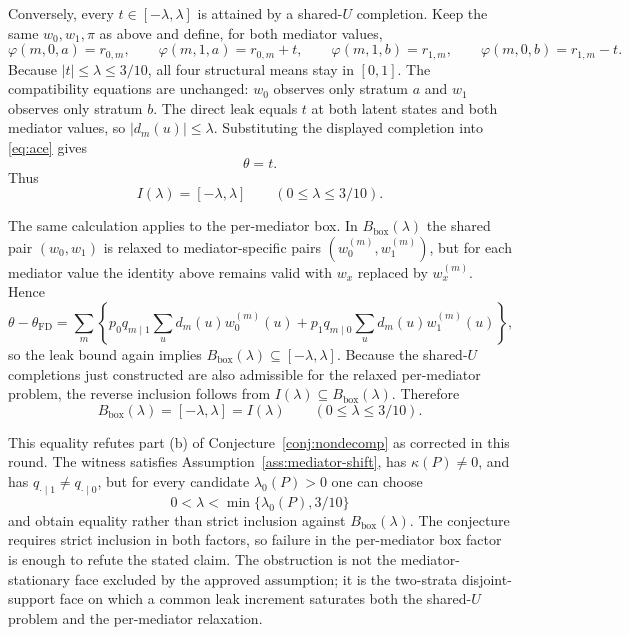 Conversely, every \(t\in[-\lambda,\lambda]\) is attained by a shared-\(U\)
completion. Keep the same \(w_0,w_1,\pi\) as above and define, for both mediator
values,
\[
  \varphi(m,0,a)=r_{0,m},\qquad
  \varphi(m,1,a)=r_{0,m}+t,\qquad
  \varphi(m,1,b)=r_{1,m},\qquad
  \varphi(m,0,b)=r_{1,m}-t.
\]
Because \(|t|\le\lambda\le3/10\), all four structural means stay in \([0,1]\).
The compatibility equations are unchanged: \(w_0\) observes only stratum \(a\)
and \(w_1\) observes only stratum \(b\). The direct leak equals \(t\) at both
latent states and both mediator values, so \(|d_m(u)|\le\lambda\). Substituting
the displayed completion into \eqref{eq:ace} gives
\[
  \theta=t.
\]
Thus
\[
  I(\lambda)=[-\lambda,\lambda]\qquad(0\le\lambda\le3/10).
\]

The same calculation applies to the per-mediator box. In
\(B_{\mathrm{box}}(\lambda)\) the shared pair \((w_0,w_1)\) is relaxed to
mediator-specific pairs \((w_0^{(m)},w_1^{(m)})\), but for each mediator value
the identity above remains valid with \(w_x\) replaced by \(w_x^{(m)}\). Hence
\[
  \theta-\theta_{\mathrm{FD}}
  =\sum_m\left\{
       p_0q_{m\mid1}\sum_u d_m(u)w_0^{(m)}(u)
       +p_1q_{m\mid0}\sum_u d_m(u)w_1^{(m)}(u)\right\},
\]
so the leak bound again implies \(B_{\mathrm{box}}(\lambda)\subseteq[-\lambda,\lambda]\).
Because the shared-\(U\) completions just constructed are also admissible for the
relaxed per-mediator problem, the reverse inclusion follows from
\(I(\lambda)\subseteq B_{\mathrm{box}}(\lambda)\). Therefore
\[
  B_{\mathrm{box}}(\lambda)=[-\lambda,\lambda]=I(\lambda)
  \qquad(0\le\lambda\le3/10).
\]

This equality refutes part (b) of Conjecture~\ref{conj:nondecomp} as corrected in
this round. The witness satisfies Assumption~\ref{ass:mediator-shift}, has
\(\kappa(P)\neq0\), and has \(q_{\cdot\mid1}\neq q_{\cdot\mid0}\), but for every
candidate \(\lambda_0(P)>0\) one can choose
\[
  0<\lambda<\min\{\lambda_0(P),3/10\}
\]
and obtain equality rather than strict inclusion against \(B_{\mathrm{box}}(\lambda)\).
The conjecture requires strict inclusion in both factors, so failure in the
per-mediator box factor is enough to refute the stated claim. The obstruction is
not the mediator-stationary face excluded by the approved assumption; it is the
two-strata disjoint-support face on which a common leak increment saturates both
the shared-\(U\) problem and the per-mediator relaxation.
